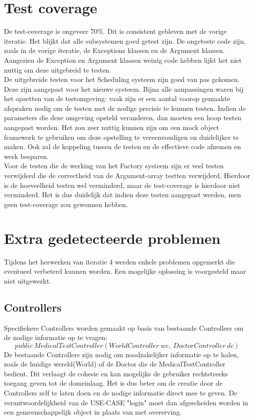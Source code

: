 \section{Test coverage}
De test-coverage is ongeveer 70\%. Dit is consistent gebleven met de vorige iteratie. Het blijkt dat alle subsystemen goed getest zijn. 
De ongeteste code zijn, zoals in de vorige iteratie, de Exceptions klassen en de Argument klassen. 
Aangezien de Exception en Argument klassen weinig code hebben lijkt het niet nuttig om deze uitgebreid te testen.\\

De uitgebreide testen voor het Scheduling systeem zijn goed van pas gekomen. 
Deze zijn aangepast voor het nieuwe systeem. 
Bijna alle aanpassingen waren bij het opzetten van de testomgeving: vaak zijn er een aantal voorop gemaakte afspraken nodig om de testen met de nodige precisie te kunnen testen.
Indien de parameters die deze omgeving opsteld veranderen, dan moeten een hoop testen aangepast worden. 
Het zou zeer nuttig kunnen zijn om een mock object framework te gebruiken om deze opstelling te vereenvoudigen en duidelijker te maken. 
Ook zal de koppeling tussen de testen en de effectieve code afnemen en werk besparen.\\

Voor de testen die de werking van het Factory systeem zijn er veel testen verwijderd die de correctheid van de Argument-array testten verwijderd. 
Hierdoor is de hoeveelheid testen wel verminderd, maar de test-coverage is hierdoor niet verminderd. 
Het is dus duidelijk dat indien deze testen aangepast werden, men geen test-coverage zou gewonnen hebben.

\section{Extra gedetecteerde problemen}
Tijdens het herwerken van iteratie 4 werden enkele problemen opgemerkt die eventueel verbeterd kunnen worden. 
Een mogelijke oplossing is voorgesteld maar niet uitgewerkt.

\subsection{Controllers}
Specifiekere Controllers worden gemaakt op basis van bestaande Controllers om de nodige informatie op te vragen: 
\[public\ MedicalTestController(WorldController\ wc,\ DoctorController\ dc)\]
De bestaande Controllers zijn nodig om noodzakelijker informatie op te halen, zoals de huidige wereld(World) of de Doctor die de MedicalTestController bedient. 
Dit verlaagt de cohesie en kan mogelijks de gebruiker rechtstreeks toegang geven tot de domeinlaag.
Het is dus beter om de creatie door de Controllers zelf te laten doen en de nodige informatie direct mee te geven. 
De verantwoordelijkheid van de USE-CASE "login" moet dan afgescheiden worden in een gemeenschappelijk object in plaats van met overerving.

